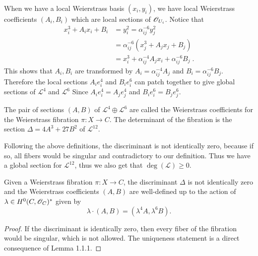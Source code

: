 When we have a local Weierstrass basis $(x_i,y_i)$, we have local Weierstrass coefficients $(A_i,B_i)$ which are local sections of $\mathscr{O}_{U_i}$. Notice that
\begin{displaymath}
\begin{split}
x_i^3+A_ix_i+B_i &=y_i^2=\alpha_{ij}^{-6}y_j^2\\
&=\alpha_{ij}^{-6}(x_j^3+A_jx_j+B_j)\\
&=x_i^3+\alpha_{ij}^{-4}A_jx_i+\alpha_{ij}^{-6}B_j\; .
\end{split}
\end{displaymath}
\indent This shows that $A_i,B_i$ are transformed by $A_i=\alpha_{ij}^{-4}A_j$ and $B_i=\alpha_{ij}^{-6}B_j$. Therefore the local sections $A_ie_i^4$ and $B_ie_i^6$ can patch together to give global sections of $\mathcal{L}^4$ and $\mathcal{L}^6$ Since $A_ie_i^4=A_je_j^4$ and $B_ie_i^6=B_je_j^6$.
\begin{defi}
The pair of sections $(A,B)$ of $\mathcal{L}^4\oplus\mathcal{L}^6$ are called the Weierstrass coefficients for the Weierstrass fibration $\pi\colon X\rightarrow C$. The determinant of the fibration is the section $\Delta=4A^3+27B^2$ of $\mathcal{L}^{12}$.
\end{defi}
Following the above definitions, the discriminant is not identically zero, because if so, all fibers would be singular and contradictory to our definition. Thus we have a global section for $\mathscr{L}^{12}$, thus we also get that $\deg(\mathscr{L})\geq 0$.\\ \indent

\begin{lemm}
Given a Weierstrass fibration $\pi\colon X\rightarrow C$, the discriminant $\Delta$ is not identically zero and the Weierstrass coefficients $(A,B)$ are well-defined up to the action of $\lambda\in H^0(C,\mathscr{O}_C)^*$ given by $$\lambda\cdot(A,B)=(\lambda^4A,\lambda^6B).$$
\end{lemm}
\begin{proof}
If the discriminant is identically zero, then every fiber of the fibration would be singular, which is not allowed. The uniqueness statement is a direct consequence of Lemma 1.1.1.
\end{proof}

